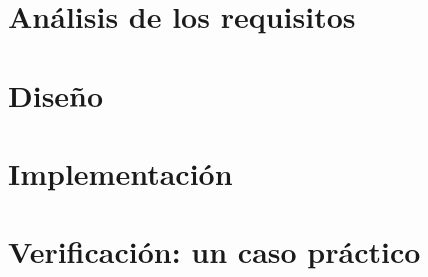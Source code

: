\section{Análisis de los requisitos}
\section{Diseño}
\section{Implementación}
\section{Verificación: un caso práctico}